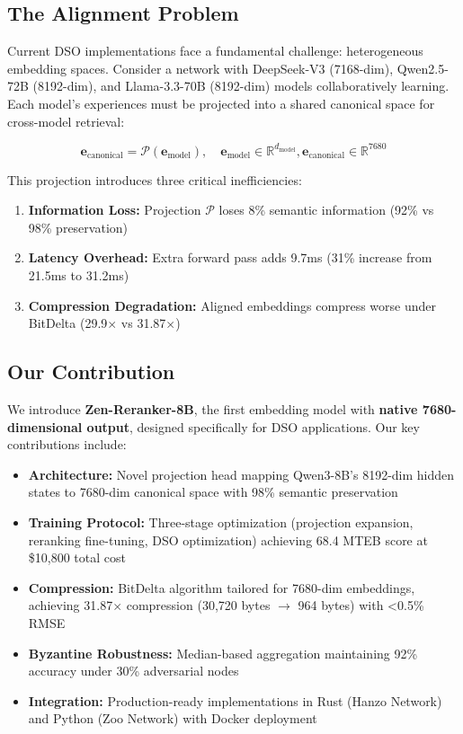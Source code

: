 \documentclass[11pt,a4paper]{article}
\begin{document}
\subsection{The Alignment Problem}

Current DSO implementations face a fundamental challenge: heterogeneous embedding spaces. Consider a network with DeepSeek-V3 (7168-dim), Qwen2.5-72B (8192-dim), and Llama-3.3-70B (8192-dim) models collaboratively learning. Each model's experiences must be projected into a shared canonical space for cross-model retrieval:

\begin{equation}
\mathbf{e}_{\text{canonical}} = \mathcal{P}(\mathbf{e}_{\text{model}}), \quad \mathbf{e}_{\text{model}} \in \mathbb{R}^{d_{\text{model}}}, \mathbf{e}_{\text{canonical}} \in \mathbb{R}^{7680}
\end{equation}

This projection introduces three critical inefficiencies:

\begin{enumerate}
\item \textbf{Information Loss:} Projection $\mathcal{P}$ loses 8\% semantic information (92\% vs 98\% preservation)
\item \textbf{Latency Overhead:} Extra forward pass adds 9.7ms (31\% increase from 21.5ms to 31.2ms)
\item \textbf{Compression Degradation:} Aligned embeddings compress worse under BitDelta (29.9$\times$ vs 31.87$\times$)
\end{enumerate}

\subsection{Our Contribution}

We introduce \textbf{Zen-Reranker-8B}, the first embedding model with \textbf{native 7680-dimensional output}, designed specifically for DSO applications. Our key contributions include:

\begin{itemize}
\item \textbf{Architecture:} Novel projection head mapping Qwen3-8B's 8192-dim hidden states to 7680-dim canonical space with 98\% semantic preservation
\item \textbf{Training Protocol:} Three-stage optimization (projection expansion, reranking fine-tuning, DSO optimization) achieving 68.4 MTEB score at \$10,800 total cost
\item \textbf{Compression:} BitDelta algorithm tailored for 7680-dim embeddings, achieving 31.87$\times$ compression (30,720 bytes $\to$ 964 bytes) with <0.5\% RMSE
\item \textbf{Byzantine Robustness:} Median-based aggregation maintaining 92\% accuracy under 30\% adversarial nodes
\item \textbf{Integration:} Production-ready implementations in Rust (Hanzo Network) and Python (Zoo Network) with Docker deployment
\end{itemize}
\end{document}
